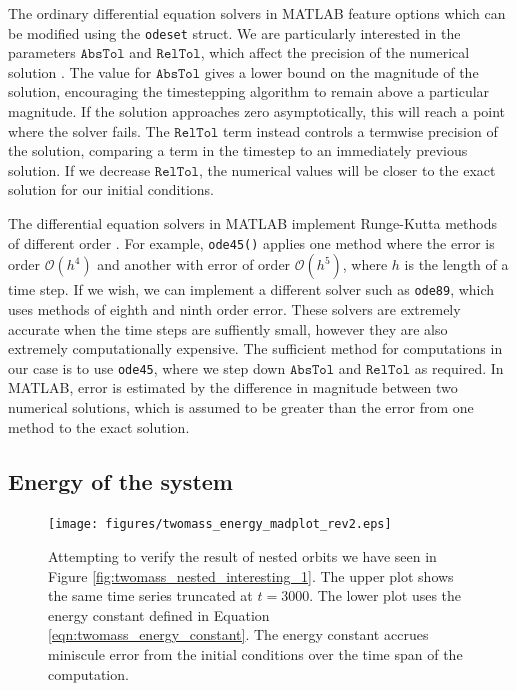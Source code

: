 The ordinary differential equation solvers in MATLAB feature options which can be modified using the \texttt{odeset} struct.
We are particularly interested in the parameters $\mathtt{AbsTol}$ and $\mathtt{RelTol}$,
which affect the precision of the numerical solution \cite{shampine_1997}.
The value for $\mathtt{AbsTol}$ gives a lower bound on the magnitude of the solution,
encouraging the timestepping algorithm to remain above a particular magnitude.
If the solution approaches zero asymptotically,
this will reach a point where the solver fails.
The $\mathtt{RelTol}$ term instead controls a termwise precision of the solution,
comparing a term in the timestep to an immediately previous solution.
If we decrease $\mathtt{RelTol}$,
the numerical values will be closer to the exact solution for our initial conditions. %

The differential equation solvers in MATLAB implement Runge-Kutta methods of different order \cite{moler_2014}.
For example, \texttt{ode45()} applies one method where the error is order $\mathcal{O}(h^4)$ and another with error of order $\mathcal{O}(h^5)$, where $h$ is the length of a time step.
If we wish, we can implement a different solver such as \texttt{ode89},
which uses methods of eighth and ninth order error.
These solvers are extremely accurate when the time steps are suffiently small,
however they are also extremely computationally expensive.
The sufficient method for computations in our case is to use \texttt{ode45},
where we step down $\mathtt{AbsTol}$ and $\mathtt{RelTol}$ as required.
In MATLAB, error is estimated by the difference in magnitude between two numerical solutions,
which is assumed to be greater than the error from one method to the exact solution. 




\subsection{Energy of the system}

\begin{figure}[h!]
    \centering
    \texttt{[image: figures/twomass\_energy\_madplot\_rev2.eps]}
    \caption{
        Attempting to verify the result of nested orbits we have seen in Figure \ref{fig:twomass_nested_interesting_1}.
        The upper plot shows the same time series truncated at $t=3000$.
        The lower plot uses the energy constant defined in Equation \ref{eqn:twomass_energy_constant}.
        The energy constant accrues miniscule error from the initial conditions over the time span of the computation.
    }
    \label{fig:twomass_energy_madplot}
\end{figure}

